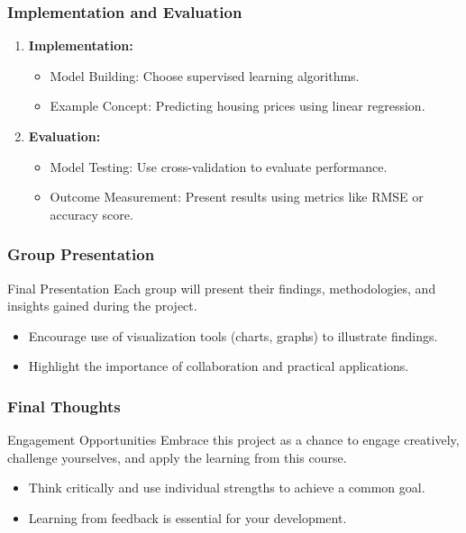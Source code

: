 \documentclass[aspectratio=169]{beamer}
\begin{document}
\begin{frame}[fragile]
    \frametitle{Implementation and Evaluation}
    \begin{enumerate}[resume]
        \item \textbf{Implementation:} 
            \begin{itemize}
                \item Model Building: Choose supervised learning algorithms.
                \item Example Concept: Predicting housing prices using linear regression.
            \end{itemize}
        \item \textbf{Evaluation:}
            \begin{itemize}
                \item Model Testing: Use cross-validation to evaluate performance.
                \item Outcome Measurement: Present results using metrics like RMSE or accuracy score.
            \end{itemize}
    \end{enumerate}
\end{frame}

\begin{frame}[fragile]
    \frametitle{Group Presentation}
    \begin{block}{Final Presentation}
        Each group will present their findings, methodologies, and insights gained during the project.
        \begin{itemize}
            \item Encourage use of visualization tools (charts, graphs) to illustrate findings.
            \item Highlight the importance of collaboration and practical applications.
        \end{itemize}
    \end{block}
\end{frame}

\begin{frame}[fragile]
    \frametitle{Final Thoughts}
    \begin{block}{Engagement Opportunities}
        Embrace this project as a chance to engage creatively, challenge yourselves, and apply the learning from this course.
        \begin{itemize}
            \item Think critically and use individual strengths to achieve a common goal.
            \item Learning from feedback is essential for your development.
        \end{itemize}
    \end{block}
\end{frame}
\end{document}
